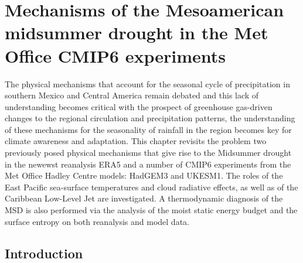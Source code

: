
\chapter{\label{ch:5-msd}Mechanisms of the Mesoamerican midsummer drought in the Met Office CMIP6 experiments}


The physical mechanisms that account for the seasonal cycle of precipitation in southern Mexico and Central America remain debated and this lack of understanding becomes critical with the prospect of greenhouse gas-driven changes to the regional circulation and precipitation patterns, the understanding of these mechanisms for the seasonality of rainfall in the region becomes key for climate awareness and adaptation. 
This chapter revisits the problem two previously posed physical mechanisms that give rise to the Midsummer drought in the newewst reanalysis ERA5 and a number of CMIP6 experiments from the Met Office Hadley Centre models: HadGEM3 and UKESM1. 
The roles of the East Pacific sea-surface temperatures and cloud radiative effects, as well as of the Caribbean Low-Level Jet are investigated. 
A thermodynamic diagnosis of the MSD is also performed via the analysis of the moist static energy budget and the surface entropy on both reanalysis and model data. 

\section{Introduction}

